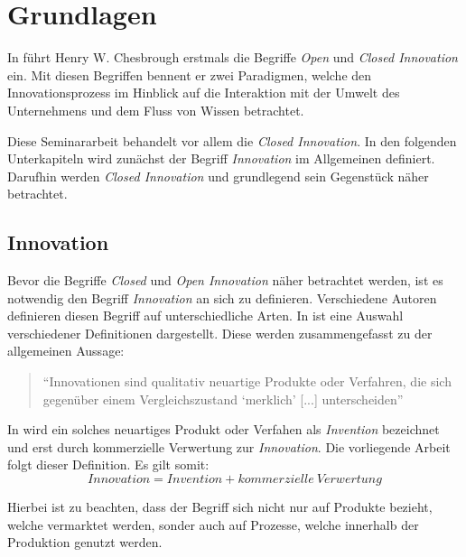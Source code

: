 \section{Grundlagen}\label{sec:grundlagen}
In \cite{chesbrough2003} führt Henry W. Chesbrough erstmals die Begriffe \textit{Open} und
\textit{Closed Innovation} ein.
Mit diesen Begriffen bennent er zwei Paradigmen, welche den Innovationsprozess im Hinblick auf die
Interaktion mit der Umwelt des Unternehmens und dem Fluss von Wissen betrachtet.

Diese Seminararbeit behandelt vor allem die \textit{Closed Innovation}.
In den folgenden Unterkapiteln wird zunächst der Begriff \textit{Innovation} im Allgemeinen definiert.
Darufhin werden \textit{Closed Innovation} und grundlegend sein Gegenstück näher betrachtet.


\subsection{Innovation}\label{sec:grundlagen-inno}
Bevor die Begriffe \textit{Closed} und \textit{Open Innovation} näher betrachtet werden,
ist es notwendig den Begriff \textit{Innovation} an sich zu definieren.
Verschiedene Autoren definieren diesen Begriff auf unterschiedliche Arten.
In \cite[5]{hauschildt2016innovationsmanagement} ist eine Auswahl verschiedener Definitionen dargestellt.
Diese werden zusammengefasst zu der allgemeinen Aussage:
\begin{quote}
    \enquote{Innovationen sind qualitativ neuartige Produkte oder Verfahren,
    die sich gegenüber einem Vergleichszustand \enquote{merklich} [...] unterscheiden}
    \cite[4]{hauschildt2016innovationsmanagement}
\end{quote}

In \cite[9]{herzog2011} wird ein solches neuartiges Produkt oder Verfahen als \textit{Invention} bezeichnet und erst durch kommerzielle Verwertung zur \textit{Innovation}.
Die vorliegende Arbeit folgt dieser Definition.
Es gilt somit:
\begin{equation*}
    Innovation = Invention + kommerzielle~Verwertung
\end{equation*}

Hierbei ist zu beachten, dass der Begriff sich nicht nur auf Produkte bezieht, welche vermarktet werden,
sonder auch auf Prozesse, welche innerhalb der Produktion genutzt werden.

